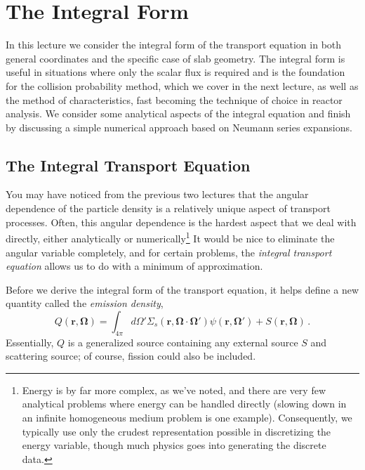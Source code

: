 \chapter{The Integral Form}
\label{lec:integral}

In this lecture we consider the integral form of the transport equation in both general coordinates and the specific case of slab geometry.  The integral form is useful in situations where only the scalar flux is required and is the foundation for the collision probability method, which we cover in the next lecture, as well as the method of characteristics, fast becoming the technique of choice in reactor analysis.  We consider some analytical aspects of the integral equation and finish by discussing a simple numerical approach based on Neumann series expansions.

\section*{The Integral Transport Equation}

You may have noticed from the previous two lectures that the angular dependence of the particle density is a relatively unique aspect of transport processes.  Often, this angular dependence is the hardest aspect that we deal with directly, either analytically or numerically\footnote{Energy is by far more complex, as we've noted, and there are very few analytical problems where energy can be handled directly (slowing down in an infinite homogeneous medium problem is one example). Consequently, we typically use only the crudest representation possible in discretizing the energy variable, though much physics goes into generating the discrete data.}  It would be nice to eliminate the angular variable completely, and for certain problems, the \textit{ integral transport equation} allows us to do with a minimum of approximation.

Before we derive the integral form of the transport equation, it helps define a new quantity called the \textit{emission density},
\begin{equation}
  Q(\mathbf{r},\mathbf{\Omega}) = \int_{4\pi} d\Omega' \Sigma_s(\mathbf{r},\mathbf{\Omega}\cdot\mathbf{\Omega}')\psi(\mathbf{r},\mathbf{\Omega'}) + S(\mathbf{r},\mathbf{\Omega}) \, .
  \label{eq:emissiondensity}
\end{equation}
Essentially, $Q$ is a generalized source containing any external source $S$ and scattering source; of course, fission could also be included.

